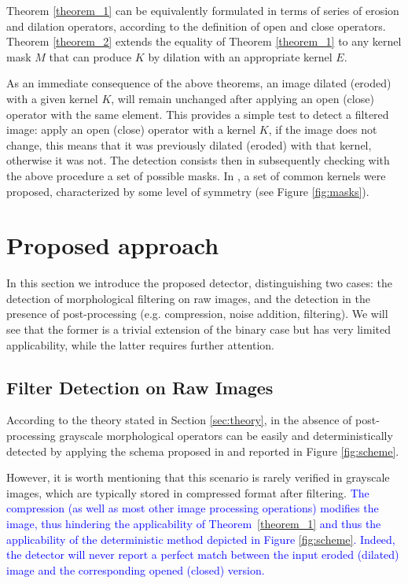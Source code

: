 \documentclass{ieeeaccess}
\begin{document}
Theorem \ref{theorem_1} can be equivalently formulated in terms of series of erosion and dilation operators, according to the definition of open and close operators. Theorem \ref{theorem_2} extends the equality of Theorem \ref{theorem_1} to any kernel mask $M$ that can produce $K$ by dilation with an appropriate kernel $E$.

As an immediate consequence of the above theorems, an image dilated (eroded) with a given kernel $K$, will remain unchanged after applying an open (close) operator with the same element. This provides a simple test to detect a filtered image: apply an open (close) operator with a kernel $K$, if the image does not change, this means that it was previously dilated (eroded) with that kernel, otherwise it was not. The detection consists then in subsequently checking with the above procedure a set of possible masks. In \cite{de2017detecting}, a set of common kernels were proposed, characterized by some level of symmetry (see Figure \ref{fig:masks}).



\section{Proposed approach}
\label{sec:method}

In this section we introduce the proposed detector, distinguishing two cases: the detection of morphological filtering on raw images, and the detection in the presence of post-processing (e.g. compression, noise addition, filtering). We will see that the former is a trivial extension of the binary case but has very limited applicability, while the latter requires further attention.

\subsection{Filter Detection on Raw Images}

According to the theory stated in Section \ref{sec:theory}, in the absence of post-processing grayscale morphological operators can be easily and deterministically detected by applying the schema proposed in 
\cite{de2017detecting} and reported in Figure \ref{fig:scheme}.

However, it is worth mentioning that this scenario is rarely verified in grayscale images, which are typically stored in compressed format after filtering. \textcolor{blue}{The compression (as well as most other image processing operations)  modifies the image, thus hindering the applicability of Theorem~\ref{theorem_1} and thus the applicability of the deterministic method depicted in Figure \ref{fig:scheme}. Indeed, the detector will never report a perfect match between the input eroded (dilated) image and the corresponding opened (closed) version.}
\end{document}
